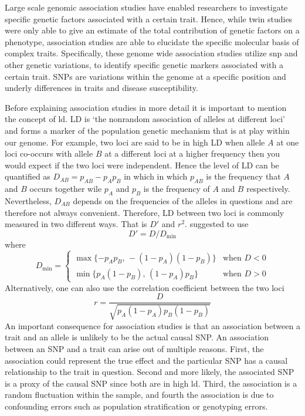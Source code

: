 Large scale genomic association studies have enabled researchers to investigate specific genetic factors associated with a certain trait.
Hence, while twin studies were only able to give an estimate of the total contribution of genetic factors on a phenotype, association studies are able to elucidate the specific molecular basis of complex traits.
Specifically, these genome wide association studies utilize \acrfull{snp} and other genetic variations, to identify specific genetic markers associated with a certain trait.
SNPs are variations within the genome at a specific position and underly differences in traits and disease susceptibility. 

Before explaining association studies in more detail it is important to mention the concept of \acrfull{ld}.
LD is `the nonrandom association of alleles at different loci'~\cite{Slatkin2008} and forms a marker of the population genetic mechanism that is at play within our genome.
For example, two loci are said to be in high LD when allele $A$ at one loci co-occurs with allele $B$ at a different loci at a higher frequency then you would expect if the two loci were independent.
Hence the level of LD can be quantified as $D_{AB}=p_{AB} - p_{A}p_{B}$ in which in which $p_{AB}$ is the frequency that $A$ and $B$ occurs together wile $p_A$ and $p_B$ is the frequency of $A$ and $B$ respectively.
Nevertheless, $D_{AB}$ depends on the frequencies of the alleles in questions and are therefore not always convenient.
Therefore, LD between two loci is commonly measured in two different ways. 
That is $D'$ and $r^2$.
\citet{Lewontin1964} suggested to use
\begin{equation}\label{eq:dprime}
  D' = D/D_{\min}
\end{equation}
where 
\begin{equation*}
  D_{\min}= \begin{cases}
    \max\{-p_A p_B,\,-(1-p_A)(1-p_B)\} & \text{when } D < 0\\
    \min\{p_A (1-p_B),\,(1-p_A) p_B\} & \text{when } D > 0
  \end{cases} 
\end{equation*}
Alternatively, one can also use the correlation coefficient between the two loci 
\begin{equation}\label{eq:r2}
  r=\frac{D}{\sqrt{p_A(1-p_A)p_B (1-p_B)}}
\end{equation}
An important consequence for association studies is that an association between a trait and an allele is unlikely to be the actual causal SNP\@.
An association between an SNP and a trait can arise out of multiple reasons.
First, the association could represent the true effect and the particular SNP has a causal relationship to the trait in question.
Second and more likely, the associated SNP is a proxy of the causal SNP since both are in high \acrshort{ld}.
Third, the association is a random fluctuation within the sample, and 
fourth the association is due to confounding errors such as population stratification or genotyping errors.

